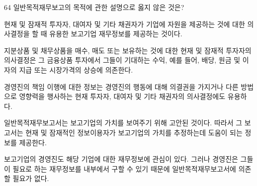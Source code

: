 \begin{question}{64}
일반목적재무보고의 목적에 관한 설명으로 옳지 않은 것은?
\begin{choices}
  \item 현재 및 잠재적 투자자, 대여자 및 기타 채권자가 기업에 자원을 제공하는 것에 대한 의사결정을 할 때 유용한 보고기업 재무정보를 제공하는 것이다.
  \item 지분상품 및 채무상품을 매수, 매도 또는 보유하는 것에 대한 현재 및 잠재적 투자자의 의사결정은 그 금융상품 투자에서 그들이 기대하는 수익, 예를 들어, 배당, 원금 및 이자의 지급 또는 시장가격의 상승에 의존한다.
  \item 경영진의 책임 이행에 대한 정보는 경영진의 행동에 대해 의결권을 가지거나 다른 방법으로 영향력을 행사하는 현재 투자자, 대여자 및 기타 채권자의 의사결정에도 유용하다.
  \item 일반목적재무보고서는 보고기업의 가치를 보여주기 위해 고안된 것이다. 따라서 그 보고서는 현재 및 잠재적인 정보이용자가 보고기업의 가치를 추정하는데 도움이 되는 정보를 제공한다.
  \item 보고기업의 경영진도 해당 기업에 대한 재무정보에 관심이 있다. 그러나 경영진은 그들이 필요로 하는 재무정보를 내부에서 구할 수 있기 때문에 일반목적재무보고서에 의존할 필요가 없다.
\end{choices}
\end{question}
